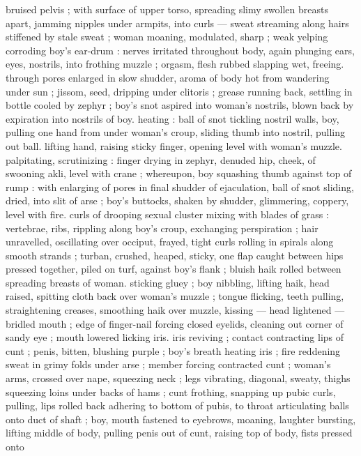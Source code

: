 bruised pelvis ; with surface of upper torso, spreading slimy swollen 
breasts apart, jamming nipples under armpits, into curls --- sweat 
streaming along hairs stiffened by stale sweat ; woman moaning, 
modulated, sharp ; weak yelping corroding boy's ear-drum : nerves 
irritated throughout body, again plunging ears, eyes, nostrils, into 
frothing muzzle ; orgasm, flesh rubbed slapping wet, freeing. 
through pores enlarged in slow shudder, aroma of body hot from 
wandering under sun ; jissom, seed, dripping under clitoris ; grease 
running back, settling in bottle cooled by zephyr ; boy's snot aspired 
into woman's nostrils, blown back by expiration into nostrils of boy. 
heating : ball of snot tickling nostril walls, boy, pulling one hand from 
under woman's croup, sliding thumb into nostril, pulling out ball. 
lifting hand, raising sticky finger, opening level with woman's muzzle. 
palpitating, scrutinizing : finger drying in zephyr, denuded hip, 
cheek, of swooning akli, level with crane ; whereupon, boy squashing 
thumb against top of rump : with enlarging of pores in final shudder 
of ejaculation, ball of snot sliding, dried, into slit of arse ; boy's 
buttocks, shaken by shudder, glimmering, coppery, level with fire. 
curls of drooping sexual cluster mixing with blades of grass : 
vertebrae, ribs, rippling along boy's croup, exchanging perspiration 
; hair unravelled, oscillating over occiput, frayed, tight curls rolling in 
spirals along smooth strands ; turban, crushed, heaped, sticky, one 
flap caught between hips pressed together, piled on turf, against 
boy's flank ; bluish haik rolled between spreading breasts of woman. 
sticking gluey ; boy nibbling, lifting haik, head raised, spitting cloth 
back over woman's muzzle ; tongue flicking, teeth pulling, 
straightening creases, smoothing haik over muzzle, kissing --- head 
lightened --- bridled mouth ; edge of finger-nail forcing closed 
eyelids, cleaning out corner of sandy eye ; mouth lowered licking iris. 
iris reviving ; contact contracting lips of cunt ; penis, bitten, blushing 
purple ; boy's breath heating iris ; fire reddening sweat in grimy folds 
under arse ; member forcing contracted cunt ; woman's arms, 
crossed over nape, squeezing neck ; legs vibrating, diagonal, sweaty, 
thighs squeezing loins under backs of hams ; cunt frothing, snapping 
up pubic curls, pulling, lips rolled back adhering to bottom of pubis, 
to throat articulating balls onto duct of shaft ; boy, mouth fastened 
to eyebrows, moaning, laughter bursting, lifting middle of body, 
pulling penis out of cunt, raising top of body, fists pressed onto 
